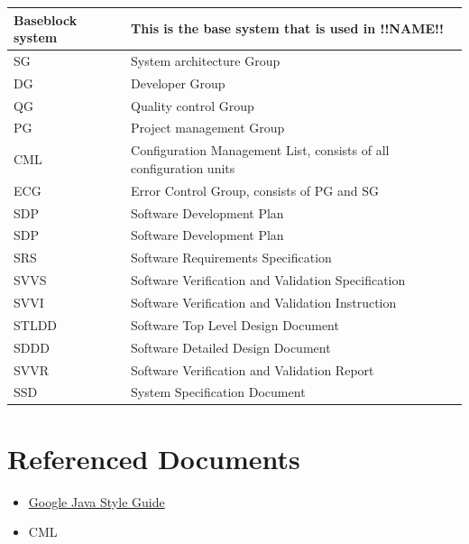 \documentclass{article}
\begin{document}
    \begin{table}[h]
        \centering
        \begin{tabular}{| p{1.5cm} | p{9cm} |}
            \hline
                Baseblock system & This is the base system that is used in !!NAME!! \\
            \hline
                SG & System architecture Group \\
            \hline
                DG & Developer Group \\
            \hline
                QG & Quality control Group \\
            \hline
                PG & Project management Group \\
            \hline 
                CML & Configuration Management List, consists of all configuration units \\
            \hline            
                ECG & Error Control Group, consists of PG and SG \\
            \hline
                SDP & Software Development Plan \\
            \hline
                SDP & Software Development Plan \\
            \hline
                SRS & Software Requirements Specification \\
            \hline
                SVVS & Software Verification and Validation Specification \\
            \hline
                SVVI & Software Verification and Validation Instruction \\
            \hline
                STLDD & Software Top Level Design Document \\
            \hline
                SDDD & Software Detailed Design Document \\
            \hline
                SVVR & Software Verification and Validation Report \\
            \hline
                SSD & System Specification Document \\
            \hline
        \end{tabular}
    \end{table}

\section{Referenced Documents}
    \begin{itemize}
        \item \href{https://google.github.io/styleguide/javaguide.html}{Google Java Style Guide}
        \item CML
    \end{itemize}
    
\end{document}
